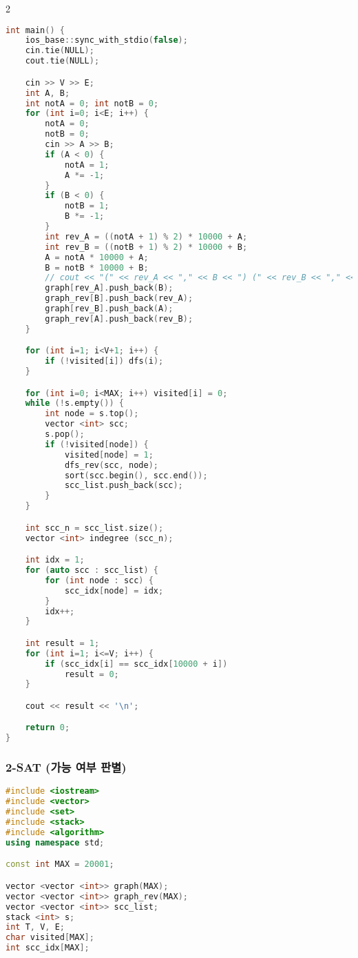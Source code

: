 \documentclass[]{article}
\begin{document}
\begin{multicols*}{2}
\begin{lstlisting}[language=c++]
int main() {
    ios_base::sync_with_stdio(false);
    cin.tie(NULL);
    cout.tie(NULL);

    cin >> V >> E;
    int A, B;
    int notA = 0; int notB = 0;
    for (int i=0; i<E; i++) {
        notA = 0;
        notB = 0;
        cin >> A >> B;
        if (A < 0) {
            notA = 1;
            A *= -1;
        }
        if (B < 0) {
            notB = 1;
            B *= -1;
        }
        int rev_A = ((notA + 1) % 2) * 10000 + A;
        int rev_B = ((notB + 1) % 2) * 10000 + B;
        A = notA * 10000 + A;
        B = notB * 10000 + B;
        // cout << "(" << rev_A << "," << B << ") (" << rev_B << "," << A << ")\n";
        graph[rev_A].push_back(B);
        graph_rev[B].push_back(rev_A);
        graph[rev_B].push_back(A);
        graph_rev[A].push_back(rev_B);
    }

    for (int i=1; i<V+1; i++) {
        if (!visited[i]) dfs(i);
    }

    for (int i=0; i<MAX; i++) visited[i] = 0;
    while (!s.empty()) {
        int node = s.top();
        vector <int> scc;
        s.pop();
        if (!visited[node]) {
            visited[node] = 1;
            dfs_rev(scc, node);
            sort(scc.begin(), scc.end());
            scc_list.push_back(scc);
        }
    }

    int scc_n = scc_list.size();
    vector <int> indegree (scc_n);

    int idx = 1;
    for (auto scc : scc_list) {
        for (int node : scc) {
            scc_idx[node] = idx;
        }
        idx++;
    }

    int result = 1;
    for (int i=1; i<=V; i++) {
        if (scc_idx[i] == scc_idx[10000 + i])
            result = 0;
    }

    cout << result << '\n';

    return 0;
}
\end{lstlisting}
\subsubsection{2-SAT (가능 여부 판별)}
\begin{lstlisting}[language=c++]
#include <iostream>
#include <vector>
#include <set>
#include <stack>
#include <algorithm>
using namespace std;

const int MAX = 20001;

vector <vector <int>> graph(MAX);
vector <vector <int>> graph_rev(MAX);
vector <vector <int>> scc_list;
stack <int> s;
int T, V, E;
char visited[MAX];
int scc_idx[MAX];



\end{lstlisting}
\end{multicols*}
\end{document}
